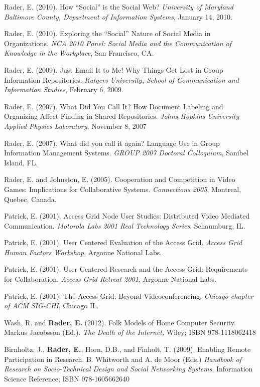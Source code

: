 \documentclass[9pt]{extarticle}
\makeatletter
\renewcommand{\section}{%
  \@startsection{section}{1}{0em}{\baselineskip}{3pt}{\large\bfseries\textsc}}
\makeatother
\begin{document}
Rader, E. (2010). How ``Social'' is the Social Web? \emph{University of Maryland Baltimore County, Department of Information Systems}, January 14, 2010.

Rader, E. (2010). Exploring the ``Social'' Nature of Social Media in Organizations. \emph{NCA 2010 Panel: Social Media and the Communication of Knowledge in the Workplace}, San Francisco, CA.

Rader, E. (2009). Just Email It to Me! Why Things Get Lost in Group Information Repositories. \emph{Rutgers University, School of Communication and Information Studies}, February 6, 2009.

Rader, E. (2007). What Did You Call It? How Document Labeling and Organizing Affect Finding in Shared Repositories. \emph{Johns Hopkins University Applied Physics Laboratory}, November 8, 2007

Rader, E. (2007). What did you call it again? Language Use in Group Information Management Systems. \emph{GROUP 2007 Doctoral Colloquium}, Sanibel Island, FL.

Rader, E. and Johnston, E. (2005). Cooperation and Competition in Video Games: Implications for Collaborative Systems. \emph{Connections 2005}, Montreal, Quebec, Canada.

Patrick, E. (2001). Access Grid Node User Studies: Distributed Video Mediated Communication. \emph{Motorola Labs 2001 Real Technology Series}, Schaumburg, IL.

Patrick, E. (2001). User Centered Evaluation of the Access Grid. \emph{Access Grid Human Factors Workshop}, Argonne National Labs.

Patrick, E. (2001). User Centered Research and the Access Grid: Requirements for Collaboration. \emph{Access Grid Retreat 2001}, Argonne National Labs.

Patrick, E. (2001). The Access Grid: Beyond Videoconferencing. \emph{Chicago chapter of ACM SIG-CHI}, Chicago IL.


\section{Book Chapters}

Wash, R. and \textbf{Rader, E.} (2012). Folk Models of Home Computer Security. Markus Jacobsson (Ed.). \emph{The Death of the Internet,} Wiley; ISBN 978-1118062418

Birnholtz, J., \textbf{Rader, E.}, Horn, D.B., and Finholt, T. (2009). Enabling Remote Participation in Research. B. Whitworth and A. de Moor (Eds.) \emph{Handbook of Research on Socio-Technical Design and Social Networking Systems}. Information Science Reference; ISBN 978-1605662640
\end{document}
